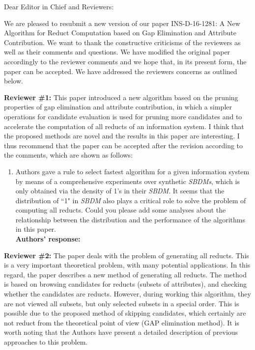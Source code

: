 \documentclass{letter}
\begin{document}
\begin{letter}{}
  \opening{Dear Editor in Chief and Reviewers:}

  We are pleased to resubmit a new version of our paper INS-D-16-1281: A New Algorithm for Reduct Computation based on Gap Elimination and Attribute Contribution. We want to thank the constructive criticisms of the reviewers as well as their comments and questions. We have modified the original paper accordingly to the reviewer comments and we hope that, in its present form, the paper can be accepted. We have addressed the reviewers concerns as outlined below.

  \textbf{Reviewer \#1:} 
  This paper introduced a new algorithm based on the pruning properties of gap elimination and attribute contribution, in which a simpler operations for candidate evaluation is used for pruning more candidates and to accelerate the computation of all reducts of an information system. I think that the proposed methods are novel and the results in this paper are interesting. I thus recommend that the paper can be accepted after the revision according to the comments, which are shown as follows:

  \begin{enumerate}
    \item Authors gave a rule to select fastest algorithm for a given information system by means of a comprehensive experiments over synthetic \textit{SBDMs}, which is only obtained via the density of 1's in their \textit{SBDM}. It seems that the distribution of ``1" in \textit{SBDM} also plays a critical role to solve the problem of computing all reducts. Could you please add some analyses about the relationship between the distribution and the performance of the algorithms in this paper.\\
    \textbf{Authors’ response:} 
  \end{enumerate}
  
  \textbf{Reviewer \#2:}
  The paper deals with the problem of generating all reducts. This is a very important theoretical problem, with many potential applications. In this regard, the paper describes a new method of generating all reducts. The method is based on browsing candidates for reducts (subsets of attributes), and checking whether the candidates are reducts. However, during working this algorithm, they are not viewed all subsets, but only selected subsets in a special order. This is possible due to the proposed method of skipping candidates, which certainly are not reduct from the theoretical point of view (GAP elimination method).
  It is worth noting that the Authors have present a detailed description of previous approaches to this problem.
  

\end{letter}
\end{document}
